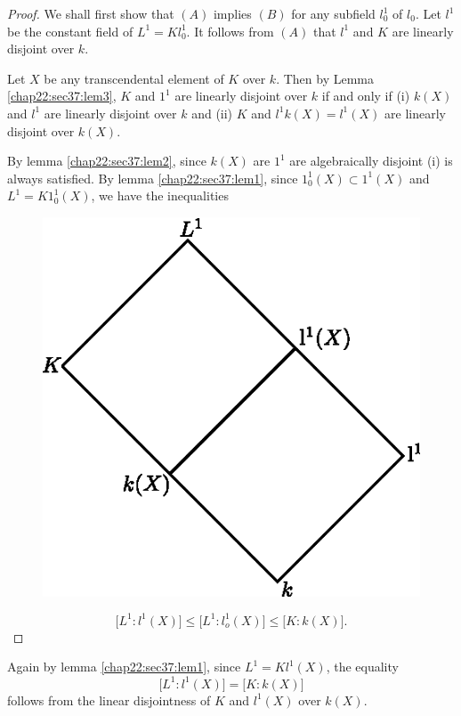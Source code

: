 \begin{proof}
  We shall first show that $(A)$ implies $(B)$ for any subfield
  $l_0^1$ of $l_0$. Let $l^1$ be the constant field of $L^1 =
  Kl_0^1$. It follows from $(A)$ that $l^1$ and  $K$ are linearly
  disjoint over $k$. 

  Let $X$ be any transcendental element of $K$ over $k$. Then by Lemma
  \ref{chap22:sec37:lem3}, $K$ and $1^1$ are linearly disjoint over $k$ if and only if
  (i) $k(X)$ and $l^1$ are linearly disjoint over $k$ and (ii) $K$
  and $l^1 k(X) = l^1 (X)$ are linearly disjoint over $k(X)$. 

  By lemma \ref{chap22:sec37:lem2}, since $k(X)$ are $1^1$ are
  algebraically disjoint   (i) is always satisfied. By
  lemma \ref{chap22:sec37:lem1}, since 
  $1^1_0 (X) \subset   1^1 (X)$ and $L^1 = K1^1_0 (X)$, we have the inequalities 
  \begin{figure}[H]
    \centerline{\includegraphics{vol18-figures/fig18.1.eps}}
  \end{figure}
  $$
  \big [ L^1 : l^1 (X) \big ] \le \big [L^1 : l^1_o (X) \big ] \le
  \big [K : k(X) \big]. 
  $$
\end{proof}

Again by lemma \ref{chap22:sec37:lem1}, since $L^1 = Kl^1 (X)$, the equality
$$
\big [ L^1 : l^1 (X) \big ] = \big [ K : k(X) \big]
$$
follows from the linear disjointness of $K$ and $l^1(X)$ over $k(X)$.

